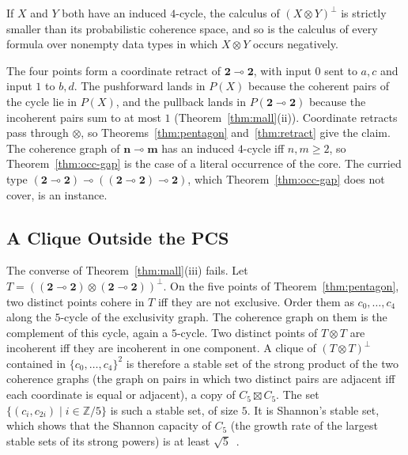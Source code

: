 \begin{theorem}
\label{thm:c4}
If $X$ and $Y$ both have an induced $4$-cycle, the calculus of
$(X \otimes Y)^{\perp}$ is strictly smaller than its probabilistic
coherence space, and so is the calculus of every formula over nonempty
data types in which $X \otimes Y$ occurs negatively.
\end{theorem}

\noindent
The four points form a coordinate retract of $\mathbf{2} \multimap
\mathbf{2}$, with input $0$ sent to $a, c$ and input $1$ to $b, d$. The
pushforward lands in $P(X)$ because the coherent pairs of the cycle lie in
$P(X)$, and the pullback lands in $P(\mathbf{2} \multimap \mathbf{2})$
because the incoherent pairs sum to at most $1$
(Theorem~\ref{thm:mall}(ii)). Coordinate retracts pass through $\otimes$,
so Theorems~\ref{thm:pentagon} and~\ref{thm:retract} give the claim. The
coherence graph of $\mathbf{n} \multimap \mathbf{m}$ has an induced
$4$-cycle iff $n, m \ge 2$, so Theorem~\ref{thm:occ-gap} is the case of a
literal occurrence of the core. The curried type $(\mathbf{2} \multimap
\mathbf{2}) \multimap ((\mathbf{2} \multimap \mathbf{2}) \multimap
\mathbf{2})$, which Theorem~\ref{thm:occ-gap} does not cover, is an
instance.

\subsection{A Clique Outside the PCS}
\label{sec:second-shannon}

The converse of Theorem~\ref{thm:mall}(iii) fails. Let
$T = ((\mathbf{2} \multimap \mathbf{2}) \otimes (\mathbf{2} \multimap
\mathbf{2}))^{\perp}$. On the five points of Theorem~\ref{thm:pentagon},
two distinct points cohere in $T$ iff they are not exclusive. Order them
as $c_0, \dots, c_4$ along the $5$-cycle of the exclusivity graph. The
coherence graph on them is the complement of this cycle, again a
$5$-cycle. Two distinct points of $T \otimes T$ are incoherent iff they
are incoherent in one component. A clique of $(T \otimes T)^{\perp}$
contained in $\{c_0, \dots, c_4\}^2$ is therefore a stable set of the
strong product of the two coherence graphs (the graph on pairs in which
two distinct pairs are adjacent iff each coordinate is equal or
adjacent), a copy of
$C_5 \boxtimes C_5$. The set $\{(c_i, c_{2i}) \mid i \in \mathbb{Z}/5\}$
is such a stable set, of size $5$. It is Shannon's stable set, which
shows that the Shannon capacity of $C_5$ (the growth rate of the largest
stable sets of its strong powers) is at least
$\sqrt5$~\cite{lovasz1979}.

